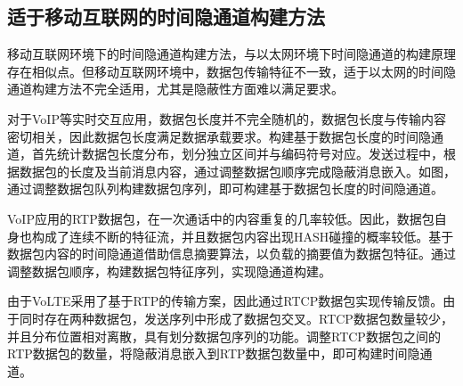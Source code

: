 \subsection{适于移动互联网的时间隐通道构建方法}
\label{chap:backinfo:ctc:mobile}
移动互联网环境下的时间隐通道构建方法，与以太网环境下时间隐通道的构建原理存在相似点。但移动互联网环境中，数据包传输特征不一致，适于以太网的时间隐通道构建方法不完全适用，尤其是隐蔽性方面难以满足要求。


对于VoIP等实时交互应用，数据包长度并不完全随机的，数据包长度与传输内容密切相关，因此数据包长度满足数据承载要求。构建基于数据包长度的时间隐通道，首先统计数据包长度分布，划分独立区间并与编码符号对应。发送过程中，根据数据包的长度及当前消息内容，通过调整数据包顺序完成隐蔽消息嵌入。如图，通过调整数据包队列构建数据包序列，即可构建基于数据包长度的时间隐通道。

VoIP应用的RTP数据包，在一次通话中的内容重复的几率较低。因此，数据包自身也构成了连续不断的特征流，并且数据包内容出现HASH碰撞的概率较低。基于数据包内容的时间隐通道借助信息摘要算法，以负载的摘要值为数据包特征。通过调整数据包顺序，构建数据包特征序列，实现隐通道构建。

由于VoLTE采用了基于RTP的传输方案，因此通过RTCP数据包实现传输反馈。由于同时存在两种数据包，发送序列中形成了数据包交叉。RTCP数据包数量较少，并且分布位置相对离散，具有划分数据包序列的功能。调整RTCP数据包之间的RTP数据包的数量，将隐蔽消息嵌入到RTP数据包数量中，即可构建时间隐通道。

